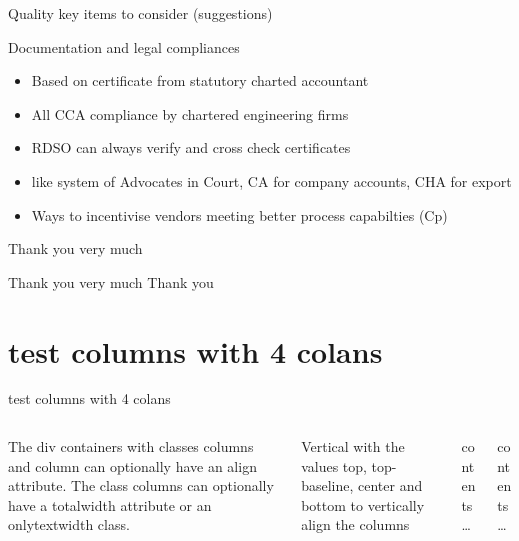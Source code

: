 \documentclass[
  10pt,
  ignorenonframetext,
  aspectratio=43,
]{beamer}
\begin{document}
\begin{frame}{Quality key items to consider (suggestions)}
\begin{block}{Documentation and legal compliances}
\protect\hypertarget{documentation-and-legal-compliances}{}
\begin{itemize}
\item
  Based on certificate from statutory charted accountant
\item
  All CCA compliance by chartered engineering firms
\item
  RDSO can always verify and cross check certificates
\item
  like system of Advocates in Court, CA for company accounts, CHA for
  export
\item
  Ways to incentivise vendors meeting better process capabilties (Cp)
\end{itemize}
\end{block}
\end{frame}

\begin{frame}{Thank you very much}
\protect\hypertarget{thank-you-very-much}{}
\begin{block}{Thank you very much}
\protect\hypertarget{thank-you-very-much-1}{}
Thank you
\end{block}
\end{frame}

\hypertarget{test-columns-with-4-colans}{%
\section{test columns with 4 colans}\label{test-columns-with-4-colans}}

\begin{frame}{test columns with 4 colans}
\begin{columns}[c,totalwidth=8em]
The div containers with classes columns and column can optionally have
an align attribute. The class columns can optionally have a totalwidth
attribute or an onlytextwidth class.

Vertical with the values top, top-baseline, center and bottom to
vertically align the columns

\begin{column}{0.4\textwidth}
contents\ldots{}
\end{column}

\begin{column}[b]{0.6\textwidth}
contents\ldots{}
\end{column}
\end{columns}
\end{frame}
\end{document}
